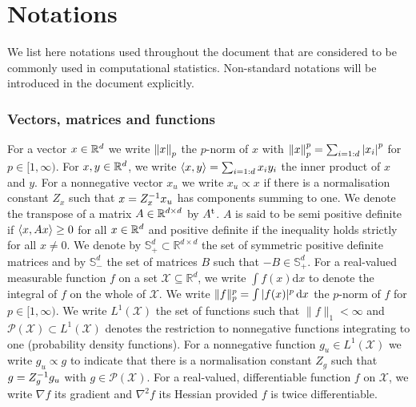 
\chapter*{Notations}
\setcounter{page}{1}

We list here notations used throughout the document that are considered to be commonly used in computational statistics. Non-standard notations will be introduced in the document explicitly.

\subsection*{Vectors, matrices and functions} 
For a vector $x\in\mathbb R^{d}$ we write $\left\|x\right\|_{p}$ the $p$-norm of $x$ with $\left\|x\right\|_{p}^{p}=\sum_{i=1:d}\left|x_{i}\right|^{p}$ for $p\in[1,\infty)$. 
For $x,y\in\mathbb R^{d}$, we write $\left\langle x,y \right\rangle=\sum_{i=1:d}x_{i}y_{i}$ the inner product of $x$ and $y$. For a nonnegative vector $x_u$ we write $x_u\propto x$ if there is a normalisation constant $Z_x$ such that $x=Z_x^{-1} x_u$ has components summing to one.
We denote the transpose of a matrix $A\in\mathbb R^{d\times d}$ by $A^\mathrm{t}$. $A$ is said to be semi positive definite if $\left\langle x,Ax \right\rangle\ge 0$ for all $x\in\mathbb R^{d}$ and positive definite if the inequality holds strictly for all $x\neq 0$. We denote by $\mathbb S_+^{d}\subset \mathbb R^{d\times d}$ the set of symmetric positive definite matrices and by $\mathbb S_-^{d}$ the set of matrices $B$ such that $-B\in\mathbb S_+^{d}$.
For a real-valued measurable function $f$ on a set $\mathcal X\subseteq \mathbb R^{d}$, we write $\int f(x)\mathrm d{x}$ to denote the integral of $f$ on the whole of $\mathcal X$. We write $\|f\|_{p}^{p}=\int |f(x)|^{p}\,\mathrm{d} x$ the $p$-norm of $f$ for $p\in[1,\infty)$. 
We write $L^{1}(\mathcal X)$ the set of functions such that $\|f\|_{1}<\infty$ and $\mathcal P(\mathcal X) \subset L^{1}(\mathcal X)$ denotes the restriction to nonnegative functions integrating to one (probability density functions). For a nonnegative function $g_u\in  L^{1}(\mathcal X)$ we write $g_u\propto g$ to indicate that there is a normalisation constant $Z_g$ such that $g=Z_g^{-1} g_u$ with $g\in\mathcal P(\mathcal X)$.  
For a real-valued, differentiable function $f$ on $\mathcal X$, we write $\nabla f$ its gradient and $\nabla^{2} f$ its Hessian provided $f$ is twice differentiable. 
%

